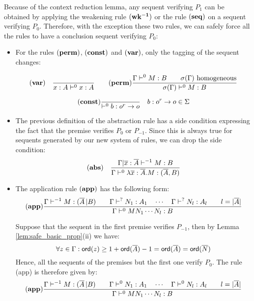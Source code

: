 Because of the context reduction lemma, any sequent verifying $P_1$ can be obtained
by applying the weakening rule $\mathbf{(wk^{-1})}$ or the rule $\mathbf{(seq)}$ on a sequent
verifying $P_0$. Therefore, with the exception these two rules, we can safely force all the rules to
have a conclusion sequent verifying $P_0$:
\begin{itemize}
\item  For the rules $\mathbf{(perm)}$, $\mathbf{(const)}$ and $\mathbf{(var)}$, only the tagging of the sequent changes:

$$ \mathbf{(var)} \quad  \frac{\displaystyle }{x : A\vdash^{0} x : A}
\qquad
  \mathbf{(perm)} \frac{\displaystyle 
      { \Gamma \vdash^0 M:B \qquad \sigma(\Gamma)  } \hbox{ homogeneous}
    }{ \sigma(\Gamma) \vdash^0 M : B }
$$

$$ \mathbf{(const)}
    \frac{\displaystyle }{ \vdash^0 b : o^r \rightarrow o} \quad b : o^r \rightarrow o \in \Sigma
$$

\item  The previous definition of the abstraction rule has a side condition
expressing the fact that the premise verifies $P_0$ or $P_{-1}$. Since this is always true for sequents
generated by our new system of rules, we can drop the side condition:
$$ \mathbf{(abs)} \quad  \frac{\displaystyle \Gamma | \overline{x} : \overline{A} \vdash^{-1} M : B}{\Gamma  \vdash^{0} \lambda \overline{x} : \overline{A} . M : (\overline{A},B)}$$


\item The application rule $\mathbf{(app)}$ has the following form:
$$ \mathbf{(app)}
    \frac{\displaystyle 
        { \Gamma \vdash^{-1} M : (\overline{A} \, | B)
        \qquad
        \Gamma \vdash^? N_1 : A_1 \quad \cdots \quad \Gamma \vdash^? N_{l} : A_l \qquad l = |\overline{A}|
        }
    }{
        \Gamma \vdash^0 M N_1 \cdots N_{l} : B
    }
$$

Suppose that the sequent in the first premise verifies $P_{-1}$, then by Lemma \ref{lem:safe_basic_prop}(ii)
we have:
$$\forall z \in \Gamma : {\sf ord}(z) \geq 1 + {\sf ord}(\overline{A}) -1 = {\sf ord}(\overline{A}) = {\sf ord}(\overline{N})$$
Hence, all the sequents of the premises but the first one verify $P_0$. The rule (app) is therefore given by:
$$ \mathbf{(app)}
    \frac{\displaystyle 
        { \Gamma \vdash^{-1} M : (\overline{A} \, | B)
        \qquad
        \Gamma \vdash^0 N_1 : A_1 \quad \cdots \quad \Gamma \vdash^0 N_{l} : A_l \qquad l = |\overline{A}|
        }
    }{
        \Gamma \vdash^0 M N_1 \cdots N_{l} : B
      }
$$


\end{itemize}
